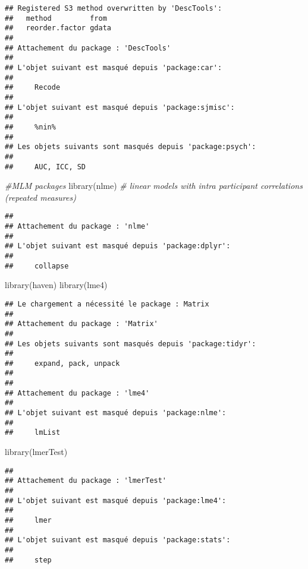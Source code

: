 \documentclass[
]{article}
\newenvironment{Shaded}{\begin{snugshade}}{\end{snugshade}}
\newcommand{\CommentTok}[1]{\textcolor[rgb]{0.56,0.35,0.01}{\textit{#1}}}
\newcommand{\FunctionTok}[1]{\textcolor[rgb]{0.00,0.00,0.00}{#1}}
\newcommand{\NormalTok}[1]{#1}
\begin{document}
\begin{verbatim}
## Registered S3 method overwritten by 'DescTools':
##   method         from 
##   reorder.factor gdata
## 
## Attachement du package : 'DescTools'
## 
## L'objet suivant est masqué depuis 'package:car':
## 
##     Recode
## 
## L'objet suivant est masqué depuis 'package:sjmisc':
## 
##     %nin%
## 
## Les objets suivants sont masqués depuis 'package:psych':
## 
##     AUC, ICC, SD
\end{verbatim}

\begin{Shaded}
\begin{Highlighting}[]
\CommentTok{\#MLM packages}
\FunctionTok{library}\NormalTok{(nlme) }\CommentTok{\# linear models with intra participant correlations (repeated measures)}
\end{Highlighting}
\end{Shaded}

\begin{verbatim}
## 
## Attachement du package : 'nlme'
## 
## L'objet suivant est masqué depuis 'package:dplyr':
## 
##     collapse
\end{verbatim}

\begin{Shaded}
\begin{Highlighting}[]
\FunctionTok{library}\NormalTok{(haven)}
\FunctionTok{library}\NormalTok{(lme4)}
\end{Highlighting}
\end{Shaded}

\begin{verbatim}
## Le chargement a nécessité le package : Matrix
## 
## Attachement du package : 'Matrix'
## 
## Les objets suivants sont masqués depuis 'package:tidyr':
## 
##     expand, pack, unpack
## 
## 
## Attachement du package : 'lme4'
## 
## L'objet suivant est masqué depuis 'package:nlme':
## 
##     lmList
\end{verbatim}

\begin{Shaded}
\begin{Highlighting}[]
\FunctionTok{library}\NormalTok{(lmerTest)}
\end{Highlighting}
\end{Shaded}

\begin{verbatim}
## 
## Attachement du package : 'lmerTest'
## 
## L'objet suivant est masqué depuis 'package:lme4':
## 
##     lmer
## 
## L'objet suivant est masqué depuis 'package:stats':
## 
##     step
\end{verbatim}
\end{document}
